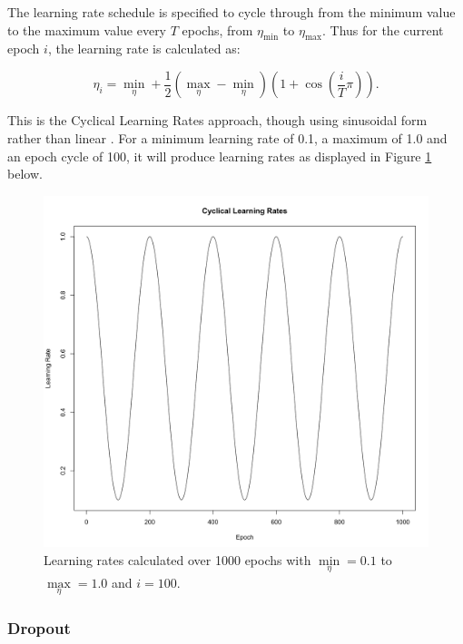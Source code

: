\documentclass[a4paper,11pt,oneside]{article}
\theoremstyle{plain}
\theoremstyle{definition}
\begin{document}
	The learning rate schedule is specified to cycle through from the minimum value to the maximum value every $T$ epochs, from $\eta_{\min}$ to $\eta_{\max}$. Thus for the current epoch $i$, the learning rate is calculated as:
	
	\begin{equation}\label{func_learning_rate_sched}
	\eta_{i}={\min\limits_{\eta} }+\frac{1}{2}\left({\max\limits_{\eta} }- {\min\limits_{\eta}}\right)\left(1+\cos \left(\frac{i}{T} \pi\right)\right) .
	\end{equation}
	
	This is the Cyclical Learning Rates approach, though using sinusoidal form rather than linear \citep{Smith}. For a minimum learning rate of 0.1, a maximum of 1.0 and an epoch cycle of 100, it will produce learning rates as displayed in Figure \ref{figure-SGDRLearningRates} below.
	
	\begin{figure}[H]
		\centering
		\includegraphics[scale=0.2]{images/implementation/CyclicalLearningRates.png}
		\caption[Cyclical Learning Rate Diagram]{Learning rates calculated over 1000 epochs with ${\min\limits_{\eta}} = 0.1$ to ${\max\limits_{\eta}} = 1.0$ and $i=100$.}
		\label{figure-SGDRLearningRates}
	\end{figure}
	
	\subsubsection{Dropout}\label{imp_dropout}
	
\end{document}
